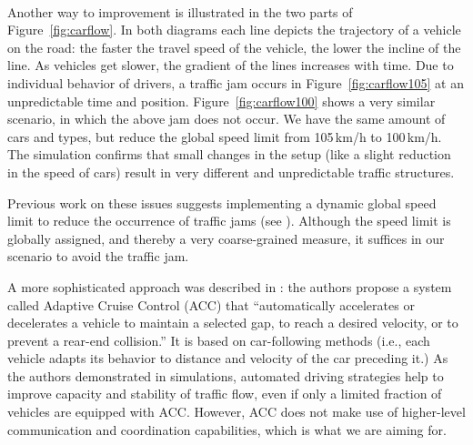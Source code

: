 \documentclass{acmrip}
\newcommand{\figref}[1]{Figure~\ref{fig:#1}}
\begin{document}
\begin{figure*}[!t]
        \begin{center}
                \mbox
                {
           \quad
                }

          \caption{\small Illustration of vehicle flow over time (traffic density \,veh/km). \figref{carflow105} shows a traffic jam that emerges from local disturbances, with a speed limit of 105\,km/h. Limiting the maximum speed by just 5\,km/h to 100\,km/h will avoid the traffic jam, as depicted in \figref{carflow100}.}
\label{fig:carflow}

        \end{center}
\end{figure*}



Another way to improvement is illustrated in the two parts of \figref{carflow}.
In both diagrams each line depicts the trajectory of a vehicle on the road: the
faster the travel speed of the vehicle, the lower the incline of the line. As
vehicles get slower, the gradient of the lines increases with time.
Due to individual behavior of drivers, a traffic jam occurs in
\figref{carflow105} at an unpredictable time and position.
\figref{carflow100} shows a very similar scenario, in which the
above jam does not occur. We have the same amount of cars and types,
but reduce the global speed limit from 105\,km/h to 100\,km/h. The
simulation confirms that small changes in the setup (like a slight
reduction in the speed of cars) result in very different and
unpredictable traffic structures.

Previous work on these issues suggests implementing a dynamic global
speed limit to reduce the occurrence of traffic jams (see
\cite{treiber-2001-49}). Although the speed limit is globally
assigned, and thereby a very coarse-grained measure, it suffices in
our scenario to avoid the traffic jam.

A more sophisticated approach was described in
\cite{ktsfh-jaacciiotd-05}: the authors propose a system called
Adaptive Cruise Control (ACC) that
    ``automatically accelerates or decelerates a vehicle to
    maintain a selected gap, to reach a desired velocity, or to
prevent a rear-end collision.'' It is based on car-following methods
(i.e., each vehicle adapts its behavior to distance and velocity of
the car preceding it.) As the authors demonstrated in simulations,
automated driving strategies help to improve capacity and stability
of traffic flow, even if only a limited fraction of vehicles are
equipped with ACC. However,
ACC does not make use of higher-level communication and coordination
capabilities, which is what we are aiming for.
\end{document}
